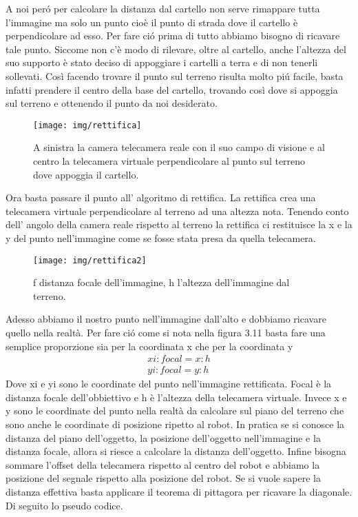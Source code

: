 		A noi per\'o per calcolare la distanza dal cartello non serve rimappare tutta l'immagine ma solo un punto cioè il punto di strada dove il cartello è perpendicolare ad esso. Per fare ci\'o prima di tutto abbiamo bisogno di ricavare tale punto. Siccome non c'è modo di rilevare, oltre al cartello, anche l'altezza del suo supporto è stato deciso di appoggiare i cartelli a terra e di non tenerli sollevati. Così facendo trovare il punto sul terreno risulta molto pi\'u facile, basta infatti prendere il centro della base del cartello, trovando così dove si appoggia sul terreno e ottenendo il punto da noi desiderato.
		\begin{figure}[!ht]
			\centering
			\texttt{[image: img/rettifica]}
			\caption[Telecamera reale e virtuale]{A sinistra la camera telecamera reale con il suo campo di visione e al centro la telecamera virtuale perpendicolare al punto sul terreno dove appoggia il cartello.}
		\end{figure}
		Ora basta passare il punto all' algoritmo di rettifica. La rettifica crea una telecamera virtuale perpendicolare al terreno ad una altezza nota. Tenendo conto dell' angolo della camera reale rispetto al terreno la rettifica ci restituisce la x e la y del punto nell'immagine come se fosse stata presa da quella telecamera.

		\begin{figure}[!ht]
			\centering
			\texttt{[image: img/rettifica2]}
			\caption[Distanza focale e distanza dal terreno]{f distanza focale dell'immagine, h l'altezza dell'immagine dal terreno.}
		\end{figure}
		Adesso abbiamo il nostro punto nell'immagine dall'alto e dobbiamo ricavare quello nella realtà. Per fare ci\'o come si nota nella figura 3.11 basta fare una semplice proporzione sia per la coordinata x che per la coordinata y
		\begin{align*}
			xi : focal = x : h
			\\
			yi : focal = y : h
		\end{align*}
		Dove xi e yi sono le coordinate del punto nell'immagine rettificata. Focal è la distanza focale dell'obbiettivo e h è l'altezza della telecamera virtuale. Invece x e y sono le coordinate del punto nella realtà da calcolare sul piano del terreno che sono anche le coordinate di posizione ripetto al robot. In pratica se si conosce la distanza del piano dell'oggetto, la posizione dell'oggetto nell'immagine e la distanza focale, allora si riesce a calcolare la distanza dell'oggetto. Infine bisogna sommare l'offset della telecamera rispetto al centro del robot e abbiamo la posizione del segnale rispetto alla posizione del robot. Se si vuole sapere la distanza effettiva basta applicare il teorema di pittagora per ricavare la diagonale. Di seguito lo pseudo codice.

